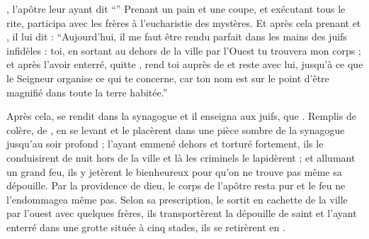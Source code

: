 ,
l'apôtre leur ayant dit \enquote{}
Prenant un pain et une coupe, et exécutant tous le rite,   participa avec les frères à l'eucharistie des mystères. %
Et après cela prenant  et , il lui dit :
\enquote{Aujourd'hui, il me faut être rendu parfait dans les mains des juifs infidèles : toi, en sortant au dehors de la ville par l'Ouest tu trouvera mon corps ; %
et après l'avoir enterré, quitte , rend toi auprès de  et reste avec lui, jusqu'à ce que le Seigneur organise ce qui te concerne, car  ton nom est sur le point  d'être magnifié dans toute la terre habitée.}

Après cela,  se rendit dans la synagogue et il enseigna aux juifs, 
  que  .
Remplis de colère,  de ,  en se levant et le placèrent dans une pièce sombre de la synagogue jusqu'au soir profond ; %
l'ayant emmené dehors et torturé fortement, ils le conduisirent de nuit hors de la ville et là les criminels le lapidèrent ;
et allumant un grand feu, ils y jetèrent le bienheureux pour qu'on ne trouve pas même sa dépouille.
Par la providence de dieu, le corps de l'apôtre resta pur et le feu ne l'endommagea même pas. %
Selon sa prescription,  le sortit en cachette de la ville par l'ouest %
avec quelques frères,
ils transportèrent la dépouille de saint  et l'ayant enterré dans une grotte située à cinq stades, %
ils se retirèrent en .

